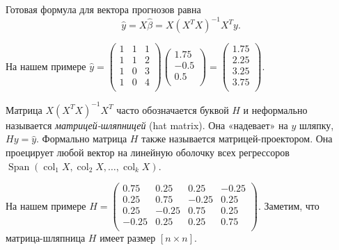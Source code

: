 \documentclass[12pt]{article}
\DeclareMathOperator{\col}{col}
\DeclareMathOperator{\Span}{Span}
\newcommand{\hb}{\hat{\beta}}
\newcommand{\hy}{\hat{y}}
\begin{document}
Готовая формула для вектора прогнозов равна 
\[
\hy = X\hb = X(X^TX)^{-1} X^Ty.
\]

На нашем примере $\hy = \begin{pmatrix}
    1 & 1 & 1 \\
    1 & 1 & 2 \\
    1 & 0 & 3 \\
    1 & 0 & 4 \\
\end{pmatrix}
\begin{pmatrix}
    1.75 \\
    -0.5\\
    0.5 \\
\end{pmatrix} = 
\begin{pmatrix}
    1.75 \\
    2.25 \\
    3.25 \\
    3.75 \\
\end{pmatrix}.
$


\begin{definition}
Матрица $X(X^TX)^{-1} X^T$ часто обозначается буквой $H$ и неформально называется \emph{матрицей-шляпницей} (hat matrix).
Она «надевает» на $y$ шляпку, $Hy = \hat y$.
Формально матрица $H$ также называется матрицей-проектором. 
Она проецирует любой вектор на линейную оболочку всех регрессоров $\Span(\col_1 X, \col_2 X, \dots, \col_k X)$.
\end{definition}

На нашем примере $H = \begin{pmatrix}
    0.75 & 0.25 & 0.25 & -0.25\\
    0.25 & 0.75 & -0.25 & 0.25\\
    0.25 & -0.25 & 0.75 & 0.25\\
    -0.25 & 0.25 & 0.25 & 0.75\\
\end{pmatrix}.$
Заметим, что матрица-шляпница $H$ имеет размер $[n \times n]$.
\end{document}

